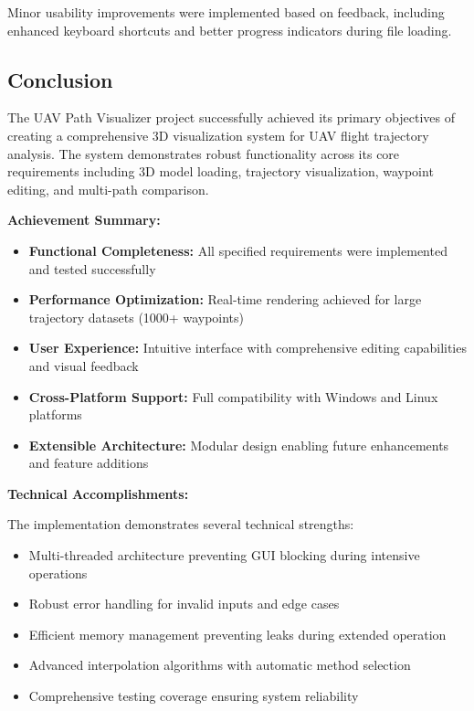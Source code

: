 \documentclass[11pt,a4paper]{article}
\begin{document}
Minor usability improvements were implemented based on feedback, including enhanced keyboard shortcuts and better progress indicators during file loading.

\subsection{Conclusion}
\label{ss:conclusion}

The UAV Path Visualizer project successfully achieved its primary objectives of creating a comprehensive 3D visualization system for UAV flight trajectory analysis. The system demonstrates robust functionality across its core requirements including 3D model loading, trajectory visualization, waypoint editing, and multi-path comparison.

\textbf{Achievement Summary:}

\begin{itemize}
\item \textbf{Functional Completeness:} All specified requirements were implemented and tested successfully
\item \textbf{Performance Optimization:} Real-time rendering achieved for large trajectory datasets (1000+ waypoints)
\item \textbf{User Experience:} Intuitive interface with comprehensive editing capabilities and visual feedback
\item \textbf{Cross-Platform Support:} Full compatibility with Windows and Linux platforms
\item \textbf{Extensible Architecture:} Modular design enabling future enhancements and feature additions
\end{itemize}

\textbf{Technical Accomplishments:}

The implementation demonstrates several technical strengths:
\begin{itemize}
\item Multi-threaded architecture preventing GUI blocking during intensive operations
\item Robust error handling for invalid inputs and edge cases
\item Efficient memory management preventing leaks during extended operation
\item Advanced interpolation algorithms with automatic method selection
\item Comprehensive testing coverage ensuring system reliability
\end{itemize}
\end{document}

